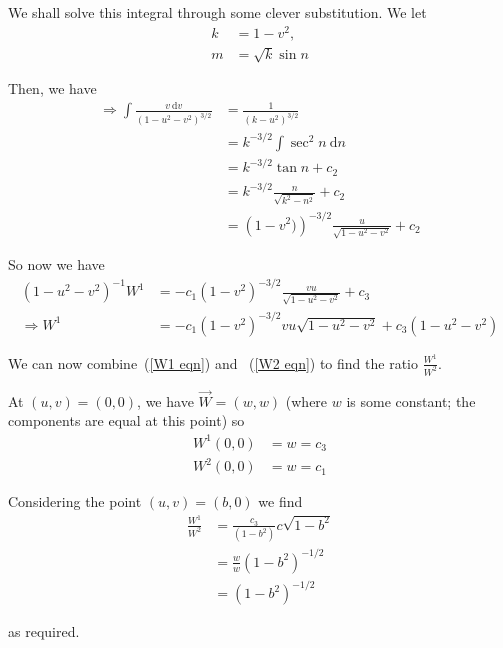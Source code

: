 \documentclass[a4paper]{article} %
\begin{document}
We shall solve this integral through some clever substitution. We let
\begin{align}
k&=1-v^2,\\
m&=\sqrt{k}\sin n
\end{align}

Then, we have
\begin{align}
\Rightarrow \int\frac{v~\text{d}v}{(1-u^2-v^2)^{3/2}}&=\frac{1}{(k-u^2)^{3/2}}\\
&=k^{-3/2}\int \sec^2 n ~ \text{d}n\\
&=k^{-3/2}\tan n + c_2\\
&=k^{-3/2}\frac{n}{\sqrt{k^2-n^2}}+c_2\\
&=\left(1-v^2)\right)^{-3/2}\frac{u}{\sqrt{1-u^2-v^2}}+c_2
\end{align}

So now we have
\begin{align}
\left(1-u^2-v^2\right)^{-1}W^{1}&=-c_1\left(1-v^2\right)^{-3/2}\frac{vu}{\sqrt{1-u^2-v^2}}+c_3\\
\Rightarrow W^{1}&=-c_1 \left(1-v^2\right)^{-3/2}vu\sqrt{1-u^2-v^2}+c_3\left(1-u^2-v^2\right)
\label{W1 eqn}
\end{align}

We can now combine~(\ref{W1 eqn}) and ~(\ref{W2 eqn}) to find the ratio $\frac{W^1}{W^2}$.

At $(u,v)=(0,0)$, we have $\vec{W}=(w,w)$ (where $w$ is some constant; the components are equal at this point) so
\begin{align}
W^1(0,0)&=w=c_3\\
W^2(0,0)&=w=c_1
\end{align}

Considering the point $(u,v)=(b,0)$ we find
\begin{align}
\frac{W^1}{W^2}&=\frac{c_3}{(1-b^2)}{c\sqrt{1-b^2}}\\
&=\frac{w}{w}\left(1-b^2\right)^{-1/2}\\
&=\left(1-b^2\right)^{-1/2}
\end{align}

as required.
\end{document}
